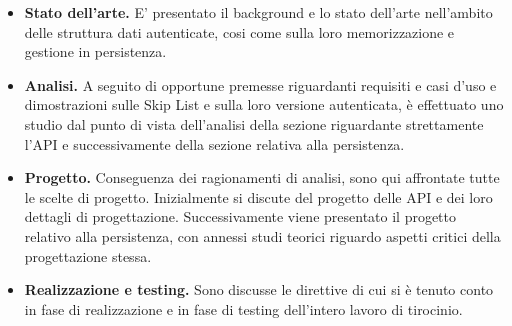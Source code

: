 		\begin{itemize}
			\item \textbf{Stato dell'arte.} E' presentato il background e lo stato dell'arte nell'ambito delle struttura dati autenticate, cosi come sulla loro memorizzazione e gestione in persistenza.
			\item \textbf{Analisi.} A seguito di opportune premesse riguardanti requisiti e casi d'uso e dimostrazioni sulle Skip List e sulla loro versione autenticata, è effettuato uno studio dal punto di vista dell'analisi della sezione riguardante strettamente l'API e successivamente della sezione relativa alla persistenza.
			\item \textbf{Progetto.} Conseguenza dei ragionamenti di analisi, sono qui affrontate tutte le scelte di progetto. Inizialmente si discute del progetto delle API e dei loro dettagli di progettazione. Successivamente viene presentato il progetto relativo alla persistenza, con annessi studi teorici riguardo aspetti critici della progettazione stessa.
			\item \textbf{Realizzazione e testing.} Sono discusse le direttive di cui si è tenuto conto in fase di realizzazione e in fase di testing dell'intero lavoro di tirocinio.			
		\end{itemize}